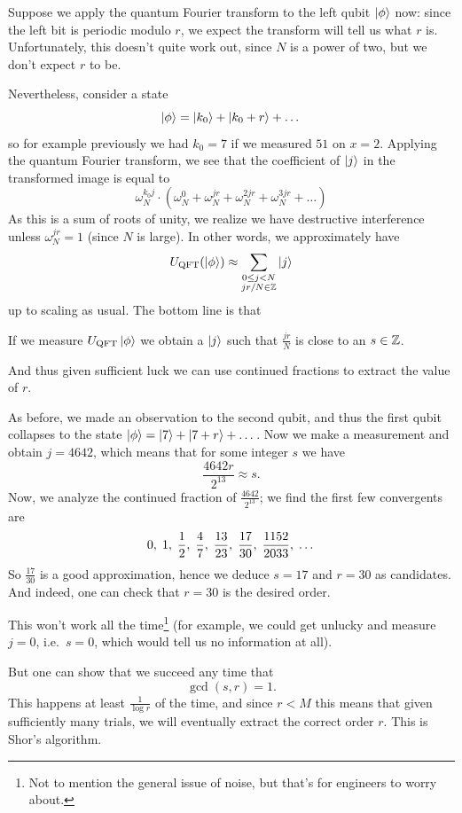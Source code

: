 Suppose we apply the quantum Fourier transform to the left qubit $\ket\phi$ now:
since the left bit is periodic modulo $r$, we expect the transform
will tell us what $r$ is.
Unfortunately, this doesn't quite work out, since $N$ is a power of two,
but we don't expect $r$ to be.

Nevertheless, consider a state
\[ \ket\phi = \ket{k_0} + \ket{k_0+r} + \dots \]
so for example previously we had $k_0=7$ if we measured $51$ on $x=2$.
Applying the quantum Fourier transform, we see that the
coefficient of $\ket j$ in the transformed image is equal to
\[
	\omega_N^{k_0j} \cdot
	\left( \omega_N^{0} + \omega_N^{jr} + \omega_N^{2jr}
	+ \omega_N^{3jr} + \dots \right)
\]
As this is a sum of roots of unity, we realize we have
destructive interference unless $\omega_N^{jr} = 1$ (since $N$ is large).
In other words, we approximately have
\[
	U_{\mathrm{QFT}}(\ket\phi)
	\approx
	\sum_{\substack{0 \le j < N \\ jr/N \in \mathbb Z}} \ket j
\]
up to scaling as usual.
The bottom line is that
\begin{moral}
	If we measure $U_{\mathrm{QFT}}\ket\phi$ we obtain a $\ket j$ such that
	$\frac{jr}{N}$ is close to an $s \in \mathbb Z$.
\end{moral}
And thus given sufficient luck we can use continued fractions
to extract the value of $r$.

\begin{example}
	[Finishing the factoring of $M = 77$]
	As before, we made an observation to the second qubit,
	and thus the first qubit collapses to the state
	$\ket\phi = \ket7 + \ket{7+r} + \dots$.
	Now we make a measurement and obtain $j = 4642$, which means that
	for some integer $s$ we have
	\[ \frac{4642r}{2^{13}} \approx s. \]
	Now, we analyze the continued fraction of $\frac{4642}{2^{13}}$;
	we find the first few convergents are
	\[
		0, \;
		1, \;
		\frac{1}{2}, \;
		\frac{4}{7}, \;
		\frac{13}{23}, \;
		\frac{17}{30}, \;
		\frac{1152}{2033}, \;
		\dots
	\]
	So $\frac{17}{30}$ is a good approximation,
	hence we deduce $s = 17$ and $r = 30$ as candidates.
	And indeed, one can check that $r = 30$ is the desired order.
\end{example}

This won't work all the time\footnote{%
	Not to mention the general issue of noise, but that's for
	engineers to worry about.
} (for example, we could get unlucky and
measure $j=0$, i.e.\ $s=0$, which would tell us no information at all).

But one can show that we succeed any time that \[ \gcd(s,r) = 1. \]
This happens at least $\frac{1}{\log r}$ of the time,
and since $r < M$ this means that given sufficiently many trials,
we will eventually extract the correct order $r$.
This is Shor's algorithm.

